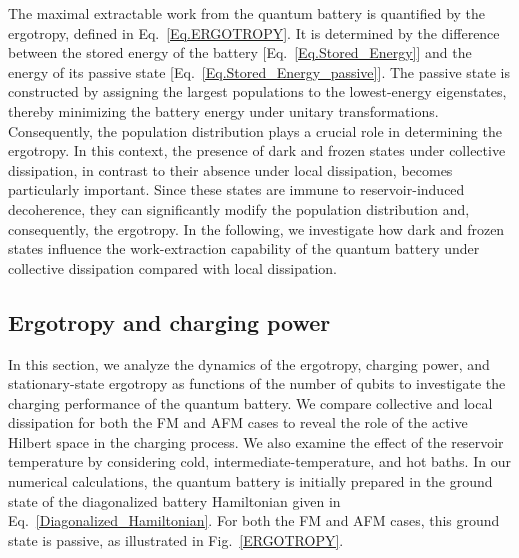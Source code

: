 \documentclass[aps,superscriptaddress,twocolumn,pre,longbibliography,floatfix]{revtex4-1}
\begin{document}
	The maximal extractable work from the quantum battery is quantified by the ergotropy, defined in Eq.~\eqref{Eq.ERGOTROPY}. It is determined by the difference between the stored energy of the battery [Eq.~\eqref{Eq.Stored_Energy}] and the energy of its passive state [Eq.~\eqref{Eq.Stored_Energy_passive}]. The passive state is constructed by assigning the largest populations to the lowest-energy eigenstates, thereby minimizing the battery energy under unitary transformations. Consequently, the population distribution plays a crucial role in determining the ergotropy. In this context, the presence of dark and frozen states under collective dissipation, in contrast to their absence under local dissipation, becomes particularly important. Since these states are immune to reservoir-induced decoherence, they can significantly modify the population distribution and, consequently, the ergotropy. In the following, we investigate how dark and frozen states influence the work-extraction capability of the quantum battery under collective dissipation compared with local dissipation.
	
	\subsection{Ergotropy and charging power }\label{Ergotropy_power}
	In this section, we analyze the dynamics of the ergotropy, charging power, and stationary-state ergotropy as functions of the number of qubits to investigate the charging performance of the quantum battery. We compare collective and local dissipation for both the FM and AFM cases to reveal the role of the active Hilbert space in the charging process. We also examine the effect of the reservoir temperature by considering cold, intermediate-temperature, and hot baths. In our numerical calculations, the quantum battery is initially prepared in the ground state of the diagonalized battery Hamiltonian given in Eq.~\eqref{Diagonalized_Hamiltonian}. For both the FM and AFM cases, this ground state is passive, as illustrated in Fig.~\ref{ERGOTROPY}.
	
\end{document}
